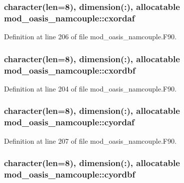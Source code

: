 \hypertarget{classmod__oasis__namcouple_ab52bc27bf5898cc85dce0fc60feb9320}{
\subsubsection[{cxordaf}]{\setlength{\rightskip}{0pt plus 5cm}character(len=8), dimension(\+:), allocatable mod\+\_\+oasis\+\_\+namcouple\+::cxordaf\hspace{0.3cm}{\ttfamily [private]}}}\label{classmod__oasis__namcouple_ab52bc27bf5898cc85dce0fc60feb9320}


Definition at line 206 of file mod\+\_\+oasis\+\_\+namcouple.\+F90.

\hypertarget{classmod__oasis__namcouple_a2ee5f8ec71ebae64c3d14445345d7545}{
\subsubsection[{cxordbf}]{\setlength{\rightskip}{0pt plus 5cm}character(len=8), dimension(\+:), allocatable mod\+\_\+oasis\+\_\+namcouple\+::cxordbf\hspace{0.3cm}{\ttfamily [private]}}}\label{classmod__oasis__namcouple_a2ee5f8ec71ebae64c3d14445345d7545}


Definition at line 204 of file mod\+\_\+oasis\+\_\+namcouple.\+F90.

\hypertarget{classmod__oasis__namcouple_a68de802180c51365e7d4bcc5180ac93b}{
\subsubsection[{cyordaf}]{\setlength{\rightskip}{0pt plus 5cm}character(len=8), dimension(\+:), allocatable mod\+\_\+oasis\+\_\+namcouple\+::cyordaf\hspace{0.3cm}{\ttfamily [private]}}}\label{classmod__oasis__namcouple_a68de802180c51365e7d4bcc5180ac93b}


Definition at line 207 of file mod\+\_\+oasis\+\_\+namcouple.\+F90.

\hypertarget{classmod__oasis__namcouple_ae1debe43f1c5cffeeb1d0d9ab563f4c4}{
\subsubsection[{cyordbf}]{\setlength{\rightskip}{0pt plus 5cm}character(len=8), dimension(\+:), allocatable mod\+\_\+oasis\+\_\+namcouple\+::cyordbf\hspace{0.3cm}{\ttfamily [private]}}}\label{classmod__oasis__namcouple_ae1debe43f1c5cffeeb1d0d9ab563f4c4}


